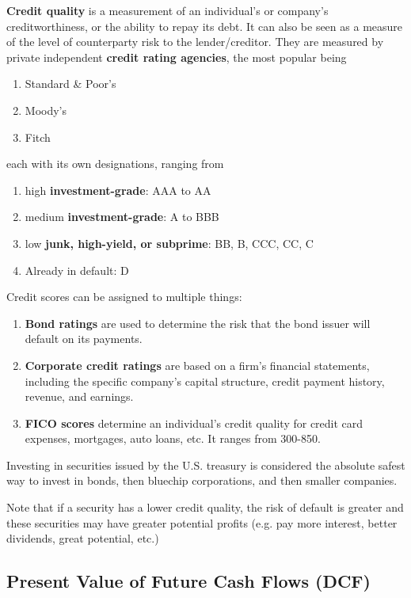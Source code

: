 \documentclass{article}
\begin{document}
    \begin{definition}
      \textbf{Credit quality} is a measurement of an individual's or company's creditworthiness, or the ability to repay its debt. It can also be seen as a measure of the level of counterparty risk to the lender/creditor. They are measured by private independent \textbf{credit rating agencies}, the most popular being
      \begin{enumerate}
        \item Standard \& Poor's 
        \item Moody's 
        \item Fitch
      \end{enumerate}
      each with its own designations, ranging from 
      \begin{enumerate}
        \item high \textbf{investment-grade}: AAA to AA
        \item medium \textbf{investment-grade}: A to BBB
        \item low \textbf{junk, high-yield, or subprime}: BB, B, CCC, CC, C
        \item Already in default: D 
      \end{enumerate}
      Credit scores can be assigned to multiple things:
      \begin{enumerate}
        \item \textbf{Bond ratings} are used to determine the risk that the bond issuer will default on its payments. 
        \item \textbf{Corporate credit ratings} are based on a firm's financial statements, including the specific company's capital structure, credit payment history, revenue, and earnings.
        \item \textbf{FICO scores} determine an individual's credit quality for credit card expenses, mortgages, auto loans, etc. It ranges from 300-850. 
      \end{enumerate}
      Investing in securities issued by the U.S. treasury is considered the absolute safest way to invest in bonds, then bluechip corporations, and then smaller companies. 
    \end{definition}

    Note that if a security has a lower credit quality, the risk of default is greater and these securities may have greater potential profits (e.g. pay more interest, better dividends, great potential, etc.) 


  \subsection{Present Value of Future Cash Flows (DCF)}
\end{document}
